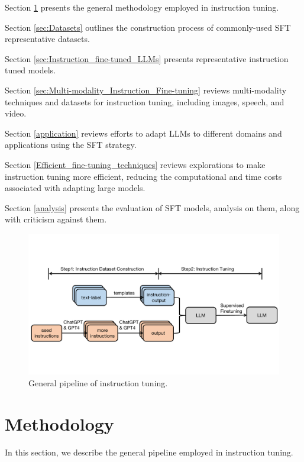 \documentclass[11pt]{article}
\begin{document}
\begin{tightitemize}
\item Section \ref{sec:Methodology} presents the general methodology employed in instruction tuning.
\item Section \ref{sec:Datasets} outlines the construction process of commonly-used SFT representative datasets.
\item Section \ref{sec:Instruction_fine-tuned_LLMs} presents representative instruction tuned  models.
\item Section \ref{sec:Multi-modality_Instruction_Fine-tuning} reviews multi-modality techniques and datasets for instruction tuning, including images, speech, and video.
\item Section \ref{application} reviews efforts to adapt LLMs to different domains and applications using the SFT strategy.
\item Section \ref{Efficient_fine-tuning_techniques} reviews explorations to make instruction tuning more efficient, reducing the computational and time costs associated with adapting large models.
\item Section \ref{analysis} presents the evaluation of SFT models, analysis on them, along with criticism against them. 
\end{tightitemize}

\begin{figure}
    \centering
    \includegraphics[width=\linewidth]{figures/method_v2.pdf}   
    \caption{General pipeline of instruction tuning.}
    \label{fig:method-overall}
\end{figure}

\section{Methodology} \label{sec:Methodology}
In this section, we describe the general pipeline employed in instruction tuning.
\end{document}
